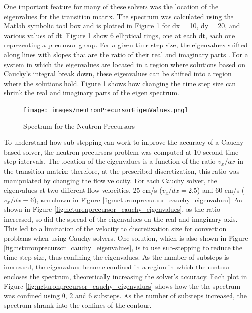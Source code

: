One important feature for many of these solvers was the location of the eigenvalues for the transition matrix. The spectrum was calculated using the Matlab symbolic tool box and is plotted in Figure \ref{fig:spectrum_neutron_precursors} for dx = 10, dy = 20, and various values of dt. Figure \ref{fig:spectrum_neutron_precursors} show 6 elliptical rings, one at each dt, each one representing a precursor group. For a given time step size, the eigenvalues shifted along lines with slopes that are the ratio of their real and imaginary parts \cite{pusaAccruacy2013}. For a system in which the eigenvalues are located in a region where solutions based on Cauchy's integral break down, these eigenvalues can be shifted into a region where the solutions hold. Figure \ref{fig:spectrum_neutron_precursors} shows how changing the time step size can shrink the real and imaginary parts of the eigen spectrum.

\begin{figure}[htbp]
    \centering
    \texttt{[image: images/neutronPrecursorEigenValues.png]}
    \caption{Spectrum for the Neutron Precursors}
    \label{fig:spectrum_neutron_precursors}
\end{figure}


To understand how sub-stepping can work to improve the accuracy of a Cauchy-based solver, the neutron precursors problem was computed at 10-second time step intervals. The location of the eigenvalues is a function of the ratio $v_{x}/dx$ in the transition matrix; therefore, at the prescribed discretization, this ratio was manipulated by changing the flow velocity. For each Cauchy solver, the eigenvalues at two different flow velocities, 25 cm/s ($v_{x}/dx = 2.5$) and 60 cm/s ($v_{x}/dx = 6$), are shown in Figure \ref{fig:neturonprecursor_cauchy_eigenvalues}. As shown in Figure \ref{fig:neturonprecursor_cauchy_eigenvalues}, as the ratio increased, so did the spread of the eigenvalues on the real and imaginary axis. This led to a limitation of the velocity to discretization size for convection problems when using Cauchy solvers. One solution, which is also shown in Figure \ref{fig:neturonprecursor_cauchy_eigenvalues}, is to use sub-stepping to reduce the time step size, thus confining the eigenvalues. As the number of substeps is increased, the eigenvalues become confined in a region in which the contour encloses the spectrum, theoretically increasing the solver's accuracy. Each plot in Figure \ref{fig:neturonprecursor_cauchy_eigenvalues} shows how the the spectrum was confined using 0, 2 and 6 substeps. As the number of substeps increased, the spectrum shrank into the confines of the contour. 

